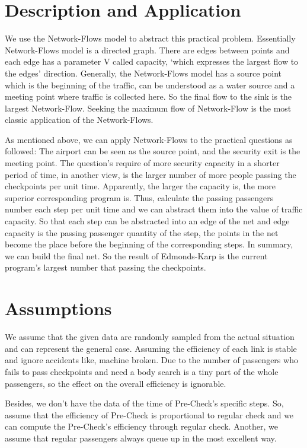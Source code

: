 \documentclass[12pt]{article}
\begin{document}
\section{Description and Application}

\setlength{\parindent}{2em}
We use the Network-Flows model to abstract this practical problem. Essentially Network-Flows model is a directed graph. There are edges between points and each edge has a parameter V called capacity, `which expresses the largest flow to the edges' direction. Generally, the Network-Flows model has a source point which is the beginning of the traffic, can be understood as a water source and a meeting point where traffic is collected here. So the final flow to the sink is the largest Network-Flow. Seeking the maximum flow of Network-Flow is the most classic application of the Network-Flows.

As mentioned above, we can apply Network-Flows to the practical questions as followed:
The airport can be seen as the source point, and the security exit is the meeting point. The question's require of more security capacity in a shorter period of time, in another view, is the larger number of more people passing the checkpoints per unit time. Apparently, the larger the capacity is, the more superior corresponding program is. Thus, calculate the passing passengers number each step per unit time and we can abstract them into the value of traffic capacity. So that each step can be abstracted into an edge of the net and edge capacity is the passing passenger quantity of the step, the points in the net become the place before the beginning of the corresponding steps.
In summary, we can build the final net. So the result of Edmonds-Karp is the current program's largest number that passing the checkpoints.

\section{Assumptions}

\setlength{\parindent}{2em}
We assume that the given data are randomly sampled from the actual situation and can represent the general case. Assuming the efficiency of each link is stable and ignore accidents like, machine broken. Due to the number of passengers who fails to pass checkpoints and need a body search is a tiny part of the whole passengers, so the effect on the overall efficiency is ignorable.

Besides, we don't have the data of the time of Pre-Check's specific steps. So, assume that the efficiency of Pre-Check is proportional to regular check and we can compute the Pre-Check's efficiency through regular check. Another, we assume that regular passengers always queue up in the most excellent way.
\end{document}
